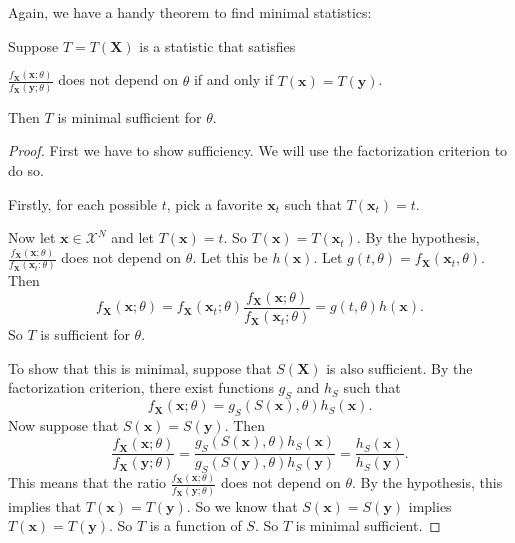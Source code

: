 \documentclass[a4paper]{article}
\begin{document}
Again, we have a handy theorem to find minimal statistics:
\begin{thm}
  Suppose $T = T(\mathbf{X})$ is a statistic that satisfies
  \begin{center}
    $\displaystyle\frac{f_\mathbf{X}(\mathbf{x}; \theta)}{f_\mathbf{X}(\mathbf{y}; \theta)}$ does not depend on $\theta$ if and only if $T(\mathbf{x}) = T(\mathbf{y})$.
  \end{center}
  Then $T$ is minimal sufficient for $\theta$.
\end{thm}
\begin{proof}
  First we have to show sufficiency. We will use the factorization criterion to do so.

  Firstly, for each possible $t$, pick a favorite $\mathbf{x}_t$ such that $T(\mathbf{x}_t) = t$.

  Now let $\mathbf{x}\in \mathcal{X}^N$ and let $T(\mathbf{x}) = t$. So $T(\mathbf{x}) = T(\mathbf{x}_t)$. By the hypothesis, $\frac{f_\mathbf{X}(\mathbf{x}; \theta)}{f_\mathbf{X}(\mathbf{x}_t: \theta)}$ does not depend on $\theta$. Let this be $h(\mathbf{x})$. Let $g(t, \theta) = f_\mathbf{X}(\mathbf{x}_t, \theta)$. Then
  \[
    f_\mathbf{X}(\mathbf{x}; \theta) = f_\mathbf{X}(\mathbf{x}_t; \theta) \frac{f_\mathbf{X}(\mathbf{x}; \theta)}{f_\mathbf{X}(\mathbf{x}_t; \theta)} = g(t, \theta) h(\mathbf{x}).
  \]
  So $T$ is sufficient for $\theta$.

  To show that this is minimal, suppose that $S(\mathbf{X})$ is also sufficient. By the factorization criterion, there exist functions $g_S$ and $h_S$ such that
  \[
    f_\mathbf{X}(\mathbf{x}; \theta) = g_S(S(\mathbf{x}), \theta) h_S(\mathbf{x}).
  \]
  Now suppose that $S(\mathbf{x}) = S(\mathbf{y})$. Then
  \[
    \frac{f_\mathbf{X}(\mathbf{x}; \theta)}{f_\mathbf{X}(\mathbf{y}; \theta)} = \frac{g_S(S(\mathbf{x}), \theta)h_S(\mathbf{x})}{g_S(S(\mathbf{y}), \theta)h_S(\mathbf{y})} = \frac{h_S(\mathbf{x})}{h_S(\mathbf{y})}.
  \]
  This means that the ratio $\frac{f_\mathbf{X}(\mathbf{x}; \theta)}{f_\mathbf{X}(\mathbf{y}; \theta)}$ does not depend on $\theta$. By the hypothesis, this implies that $T(\mathbf{x}) = T(\mathbf{y})$. So we know that $S(\mathbf{x}) = S(\mathbf{y})$ implies $T(\mathbf{x}) = T(\mathbf{y})$. So $T$ is a function of $S$. So $T$ is minimal sufficient.
\end{proof}
\end{document}
